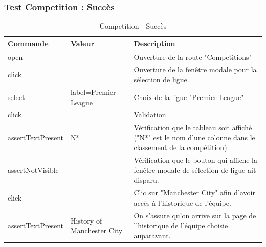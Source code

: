 \documentclass[a4paper,14pt]{extarticle}
\begin{document}
{\newpage

\subsubsection{Test Competition : Succès}

\begin{table}[htp]
    \centering
    \begin{tabular}{|m{4cm}|m{4cm}|m{6cm}|}
    \hline
    \textbf{Commande} & \textbf{Valeur}            & \textbf{Description}                                                                                          \\ \hline
    open              &                            & Ouverture de la route "Competitions"                                                                          \\ \hline
    click             &                            & Ouverture de la fenêtre modale pour la sélection de ligue                                                     \\ \hline
    select            & label=Premier League       & Choix de la ligue "Premier League"                                                                            \\ \hline
    click             &                            & Validation                                                                                                    \\ \hline
    assertTextPresent & N*                         & Vérification que le tableau soit affiché ("N*" est le nom d'une colonne dans le classement de la compétition) \\ \hline
    assertNotVisible  &                            & Vérification que le bouton qui affiche la fenêtre modale de sélection de ligue ait disparu.                   \\ \hline
    click             &                            & Clic sur "Manchester City" afin d'avoir accès à l'historique de l'équipe.                                     \\ \hline
    assertTextPresent & History of Manchester City & On s'assure qu'on arrive sur la page de l'historique de l'équipe choisie auparavant.                          \\ \hline
    \end{tabular}
    \label{tab:CompSucces}
    \caption{Competition - Succès}
\end{table}

\newpage









}
\end{document}
